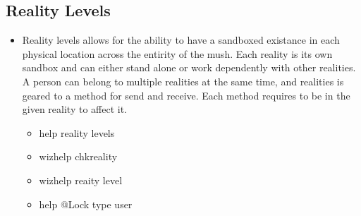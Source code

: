 \documentclass[letterpaper,10pt,english]{sphinxmanual}
\begin{document}
\subsection{Reality Levels}
\label{\detokenize{features:reality-levels}}\begin{itemize}
\item {} 
\sphinxAtStartPar
Reality levels allows for the ability to have a sandboxed \textquotesingle{}existance\textquotesingle{}
in each physical location across the entirity of the mush.  Each
reality is its own sandbox and can either stand alone or work
dependently with other realities.  A person can belong to multiple
realities at the same time, and realities is geared to a method for
send and receive.  Each \textquotesingle{}method\textquotesingle{} requires to be in the given reality
to affect it.
\begin{itemize}
\item {} 
\sphinxAtStartPar
help reality levels

\item {} 
\sphinxAtStartPar
wizhelp chkreality

\item {} 
\sphinxAtStartPar
wizhelp reaity level

\item {} 
\sphinxAtStartPar
help @Lock type user

\end{itemize}

\end{itemize}
\end{document}
